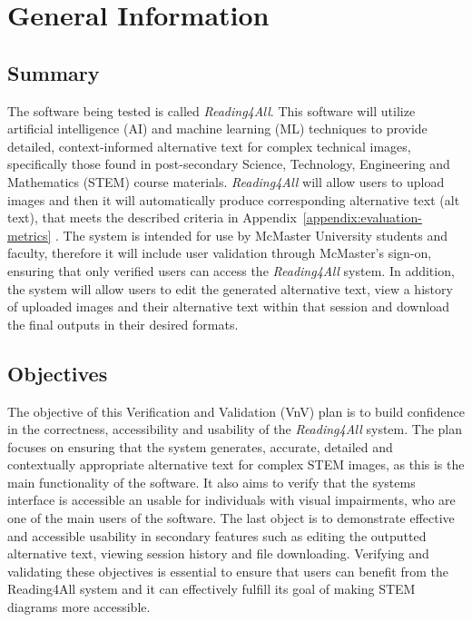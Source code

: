 \documentclass[12pt, titlepage]{article}
\begin{document}
\section{General Information} \label{geninfo}

\subsection{Summary}

The software being tested is called \textit{Reading4All}. This
software will utilize artificial intelligence (AI) and machine
learning (ML) techniques to provide detailed, context-informed
alternative text for complex technical images, specifically those
found in post-secondary Science, Technology, Engineering and Mathematics (STEM)
course materials. \textit{Reading4All} will allow users to upload
images and then it will automatically produce corresponding
alternative text (alt text), that
meets the described criteria in
Appendix~\ref{appendix:evaluation-metrics} . The system is intended for use by
McMaster University students and faculty, therefore it will include
user validation through McMaster's sign-on, ensuring that only
verified users can access the \textit{Reading4All} system.
In addition, the system will allow users to edit the generated
alternative text, view a history of uploaded images and their
alternative text within that session and download the final outputs
in their desired formats.

\subsection{Objectives}

The objective of this Verification and Validation (VnV) plan is to
build confidence in the correctness, accessibility and usability of
the \textit{Reading4All} system.
The plan focuses on ensuring that the system generates, accurate,
detailed and contextually appropriate alternative text for complex
STEM images, as this is the main functionality of the software.
It also aims to verify that the systems interface is accessible an
usable for individuals with visual impairments, who are one of the
main users of the software. The last object is to demonstrate
effective and accessible usability in secondary features
such as editing the outputted alternative text, viewing session
history and file downloading.
Verifying and validating these objectives is essential to ensure that
users can benefit from the Reading4All system and
it can effectively fulfill its goal of making STEM diagrams more accessible.
\\
\end{document}
